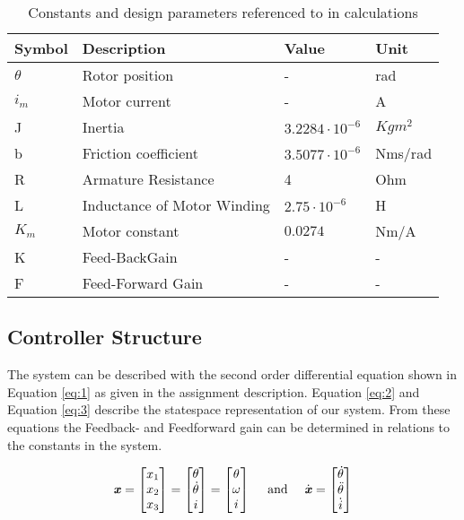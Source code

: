 	
	\begin{table}[htbp]
		\centering
		\caption{Constants and design parameters referenced to in calculations}
		\begin{tabular}{llll}
			\toprule
			Symbol & Description & Value & Unit\\ 
			\midrule
			$\theta$ & Rotor position  & -&rad \\ 
			$i_m$ & Motor current  & - &A \\ 
			J & Inertia  & $3.2284\cdot10^{-6}$&$Kgm^2$  \\ 
			b & Friction  coefficient   &$ 3.5077\cdot10^{-6} $&Nms/rad\\ 
			R & Armature Resistance  & 4 &Ohm\\
			L & Inductance of Motor Winding  & $2.75\cdot10^{-6}$&H \\ 
			$K_m$ & Motor constant  & $0.0274$&Nm/A  \\ 
			K&Feed-BackGain&-&-\\
			F&Feed-Forward Gain&-&-\\
			\midrule
		\end{tabular}
		\label{tab:constants}
	\end{table}
	
	
	
	\subsection{Controller Structure}
	\label{sec:controllerstructure}
	The system can be described with the second order differential equation shown in Equation \ref{eq:1} as given in the assignment description. Equation \ref{eq:2} and Equation \ref{eq:3} describe the statespace representation of our system. From these equations the Feedback- and Feedforward gain can be determined in relations to the constants in the system. 
	
	
	\begin{equation}
	\text{\textit{\textbf{x}}} =
	\begin{bmatrix}
	x_1 \\
	x_2  \\
	x_3   
	\end{bmatrix}
	=
	\begin{bmatrix}
	\theta\\
	\dot{\theta}\\
	i
	\end{bmatrix}
	=
	\begin{bmatrix}
	\theta\\
	\omega\\
     i
	\end{bmatrix}
	\quad\text{ and }\quad
	\dot{\text{\textit{\textbf{x}}}} =
	\begin{bmatrix}
	\dot{\theta}\\
	\ddot{\theta}\\
	\dot{i}
	\end{bmatrix}
	\vspace{.2em}
	\label{eq:1}
	\end{equation}
	

